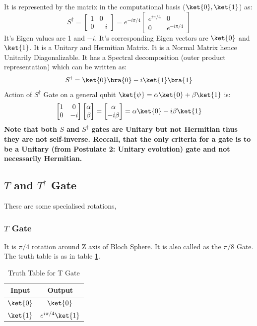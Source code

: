 \documentclass[12pt, oneside]{book}
\theoremstyle{definition}
\theoremstyle{definition}
\theoremstyle{remark}
\begin{document}
It is represented by the matrix in the computational basis ($\ket{0},\ket{1}$) as:
\[
    S^{\dagger}=\begin{bmatrix}
        1 & 0 \\
        0 & -i
    \end{bmatrix}=e^{-i\pi/4}\begin{bmatrix}
        e^{i\pi/4} & 0 \\
        0 & e^{-i\pi/4}
    \end{bmatrix}
\]
It's Eigen values are 1 and $-i$. It's corresponding Eigen vectors are $\ket{0}$ and $\ket{1}$.
It is a Unitary and Hermitian Matrix. It is a Normal Matrix hence Unitarily Diagonalizable.
It has a Spectral decomposition (outer product representation) which can be written as:
\[
    S^{\dagger}=\ket{0}\bra{0}-i\ket{1}\bra{1}
\]
Action of $S^{\dagger}$ Gate on a general qubit $\ket{\psi}=\alpha\ket{0}+\beta\ket{1}$ is:
\[
    \begin{bmatrix}
        1 & 0 \\
        0 & -i
    \end{bmatrix}\begin{bmatrix}
        \alpha \\
        \beta
    \end{bmatrix}=\begin{bmatrix}
        \alpha \\
        -i\beta
    \end{bmatrix}=\alpha\ket{0}-i\beta\ket{1}
\]
\textbf{Note that both $S$ and $S^{\dagger}$ gates are Unitary but not Hermitian thus they are not self-inverse. Reccall, that 
the only criteria for a gate is to be a Unitary (from Postulate 2: Unitary evolution) gate and not necessarily Hermitian.}

\subsection{$T$ and $T^{\dagger}$ Gate}
These are some specialised rotations,
\subsubsection{$T$ Gate}
It is $\pi/4$ rotation around Z axis of Bloch Sphere.
It is also called as the $\pi/8$ Gate. The truth table is as in table \ref{tab:t}.
\begin{table}[H]
    \centering
    \begin{tabular}{|c|c|}
        \hline
        Input & Output\\
        \hline
        $\ket{0}$ & $\ket{0}$\\
        $\ket{1}$ & $e^{i\pi/4}\ket{1}$\\
        \hline
    \end{tabular}
    \caption{Truth Table for T Gate}
    \label{tab:t}
\end{table}
\end{document}
